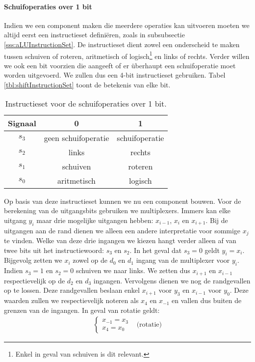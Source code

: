 \paragraph{Schuifoperaties over 1 bit}
Indien we een component maken die meerdere operaties kan uitvoeren moeten we altijd eerst een instructieset defini\"eren, zoals in subsubsectie \ref{sss:aLUInstructionSet}. De instructieset dient zowel een onderscheid te maken tussen schuiven of roteren, aritmetisch of logisch\footnote{Enkel in geval van schuiven is dit relevant.} en links of rechts. Verder willen we ook een bit voorzien die aangeeft of er \"uberhaupt een schuifoperatie moet worden uitgevoerd. We zullen dus een 4-bit instructieset gebruiken. Tabel \ref{tbl:shiftInstructionSet} toont de betekenis van elke bit.
\begin{table}[hbt]
\centering
\begin{tabular}{c|cc}
Signaal&0&1\\\hline
$s_3$&geen schuifoperatie&schuifoperatie\\
$s_2$&links&rechts\\
$s_1$&schuiven&roteren\\
$s_0$&aritmetisch&logisch
\end{tabular}
\caption{Instructieset voor de schuifoperaties over 1 bit.}
\end{table}
Op basis van deze instructieset kunnen we nu een component bouwen. Voor de berekening van de uitgangsbits gebruiken we multiplexers. Immers kan elke uitgang $y_i$ maar drie mogelijke uitgangen hebben: $x_{i-1}$, $x_i$ en $x_{i+1}$. Bij de uitgangen aan de rand dienen we alleen een andere interpretatie voor sommige $x_j$ te vinden. Welke van deze drie ingangen we kiezen hangt verder alleen af van twee bits uit het instructiewoord: $s_3$ en $s_2$. In het geval dat $s_3=0$ geldt $y_i=x_i$. Bijgevolg zetten we $x_i$ zowel op de $d_0$ en $d_1$ ingang van de multiplexer voor $y_i$. Indien $s_3=1$ en $s_2=0$ schuiven we naar links. We zetten dus $x_{i+1}$ en $x_{i-1}$ respectievelijk op de $d_2$ en $d_3$ ingangen. Vervolgens dienen we nog de randgevallen op te lossen. Deze randgevallen beslaan enkel $x_{i+1}$ voor $y_3$ en  $x_{i-1}$ voor $y_0$. Deze waarden zullen we respectievelijk noteren als $x_4$ en $x_{-1}$ en vallen dus buiten de grenzen van de ingangen. In geval van rotatie geldt:
\begin{equation}
\begin{array}{ll}
\left\{\begin{array}{l}
x_{-1}=x_3\\
x_4=x_0
\end{array}\right.&\mbox{(rotatie)}
\end{array}
\end{equation}
